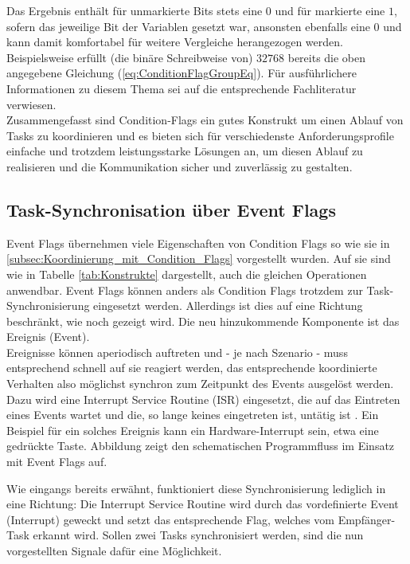 \documentclass{llncs}
\begin{document}
Das Ergebnis enthält für unmarkierte Bits stets eine $0$ und für markierte eine $1$, sofern das jeweilige Bit der Variablen gesetzt war, ansonsten ebenfalls eine $0$ und kann damit komfortabel für weitere Vergleiche herangezogen werden. Beispielsweise erfüllt (die binäre Schreibweise von) $32768$ bereits die oben angegebene Gleichung (\ref{eq:ConditionFlagGroupEq}). Für ausführlichere Informationen zu diesem Thema sei auf die entsprechende Fachliteratur verwiesen.\\

Zusammengefasst sind Condition-Flags ein gutes Konstrukt um einen Ablauf von Tasks zu koordinieren und es bieten sich für verschiedenste Anforderungsprofile einfache und trotzdem leistungsstarke Lösungen an, um diesen Ablauf zu realisieren und die Kommunikation sicher und zuverlässig zu gestalten.

\subsection{Task-Synchronisation über Event Flags}
Event Flags übernehmen viele Eigenschaften von Condition Flags so wie sie in \ref{subsec:Koordinierung_mit_Condition_Flags} vorgestellt wurden. Auf sie sind wie in Tabelle \ref{tab:Konstrukte} dargestellt, auch die gleichen Operationen anwendbar. Event Flags können anders als Condition Flags trotzdem zur Task-Synchronisierung eingesetzt werden. Allerdings ist dies auf eine Richtung beschränkt, wie noch gezeigt wird. Die neu hinzukommende Komponente ist das Ereignis (Event).\\

Ereignisse können aperiodisch auftreten und - je nach Szenario - muss entsprechend schnell auf sie reagiert werden, das entsprechende koordinierte Verhalten also möglichst synchron zum Zeitpunkt des Events ausgelöst werden. Dazu wird eine Interrupt Service Routine (ISR) eingesetzt, die auf das Eintreten eines Events wartet und die, so lange keines eingetreten ist, untätig ist \autocite[vgl.][87]{Cooling2017}. Ein Beispiel für ein solches Ereignis kann ein Hardware-Interrupt sein, etwa eine gedrückte Taste. Abbildung zeigt den schematischen Programmfluss im Einsatz mit Event Flags auf.


Wie eingangs bereits erwähnt, funktioniert diese Synchronisierung lediglich in eine Richtung: Die Interrupt Service Routine wird durch das vordefinierte Event (Interrupt) geweckt und setzt das entsprechende Flag, welches vom Empfänger-Task erkannt wird. Sollen zwei Tasks synchronisiert werden, sind die nun vorgestellten Signale dafür eine Möglichkeit.
\end{document}
